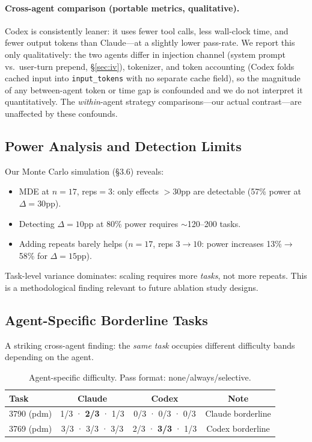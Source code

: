 \documentclass[11pt]{article}
\begin{document}
\paragraph{Cross-agent comparison (portable metrics, qualitative).}
Codex is consistently leaner: it uses fewer tool calls, less wall-clock time, and fewer output tokens than Claude---at a slightly lower pass-rate.
We report this only qualitatively: the two agents differ in injection channel (system prompt vs.\ user-turn prepend, \S\ref{sec:iv}), tokenizer, and token accounting (Codex folds cached input into \texttt{input\_tokens} with no separate cache field), so the magnitude of any between-agent token or time gap is confounded and we do not interpret it quantitatively. The \emph{within}-agent strategy comparisons---our actual contrast---are unaffected by these confounds.

\subsection{Power Analysis and Detection Limits}
\label{sec:power}

Our Monte Carlo simulation (\S3.6) reveals:
\begin{itemize}
    \item MDE at $n{=}17$, reps$=$3: only effects $>$30pp are detectable (57\% power at $\Delta{=}30$pp).
    \item Detecting $\Delta{=}10$pp at 80\% power requires ${\sim}$120--200 tasks.
    \item Adding repeats barely helps ($n{=}17$, reps $3{\to}10$: power increases 13\%${\to}$58\% for $\Delta{=}15$pp).
\end{itemize}

Task-level variance dominates: scaling requires more \emph{tasks}, not more repeats.
This is a methodological finding relevant to future ablation study designs.

\subsection{Agent-Specific Borderline Tasks}
\label{sec:borderline}

A striking cross-agent finding: the \emph{same task} occupies different difficulty bands depending on the agent.

\begin{table}[t]
\centering
\small
\caption{Agent-specific difficulty. Pass format: none/always/selective.}
\label{tab:borderline}
\begin{tabular}{lccc}
\toprule
\textbf{Task} & \textbf{Claude} & \textbf{Codex} & \textbf{Note} \\
\midrule
3790 (pdm)  & 1/3 · \textbf{2/3} · 1/3 & 0/3 · 0/3 · 0/3 & Claude borderline \\
3769 (pdm)  & 3/3 · 3/3 · 3/3          & 2/3 · \textbf{3/3} · 1/3 & Codex borderline \\
\bottomrule
\end{tabular}
\end{table}
\end{document}
